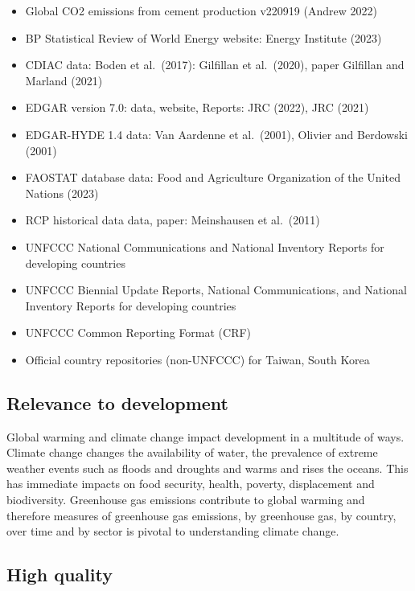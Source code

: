 \documentclass[
  letterpaper,
  DIV=11,
  numbers=noendperiod]{scrartcl}
\providecommand{\tightlist}{%
  \setlength{\itemsep}{0pt}\setlength{\parskip}{0pt}}\usepackage{longtable,booktabs,array}
\begin{document}
\begin{itemize}
\tightlist
\item
  Global CO2 emissions from cement production v220919 (Andrew 2022)
\item
  BP Statistical Review of World Energy website: Energy Institute (2023)
\item
  CDIAC data: Boden et al.~(2017): Gilfillan et al.~(2020), paper
  Gilfillan and Marland (2021)
\item
  EDGAR version 7.0: data, website, Reports: JRC (2022), JRC (2021)
\item
  EDGAR-HYDE 1.4 data: Van Aardenne et al.~(2001), Olivier and Berdowski
  (2001)
\item
  FAOSTAT database data: Food and Agriculture Organization of the United
  Nations (2023)
\item
  RCP historical data data, paper: Meinshausen et al.~(2011)
\item
  UNFCCC National Communications and National Inventory Reports for
  developing countries
\item
  UNFCCC Biennial Update Reports, National Communications, and National
  Inventory Reports for developing countries
\item
  UNFCCC Common Reporting Format (CRF)
\item
  Official country repositories (non-UNFCCC) for Taiwan, South Korea
\end{itemize}

\hypertarget{relevance-to-development}{%
\subsection{Relevance to development}\label{relevance-to-development}}

Global warming and climate change impact development in a multitude of
ways. Climate change changes the availability of water, the prevalence
of extreme weather events such as floods and droughts and warms and
rises the oceans. This has immediate impacts on food security, health,
poverty, displacement and biodiversity. Greenhouse gas emissions
contribute to global warming and therefore measures of greenhouse gas
emissions, by greenhouse gas, by country, over time and by sector is
pivotal to understanding climate change.

\hypertarget{high-quality}{%
\subsection{High quality}\label{high-quality}}
\end{document}

